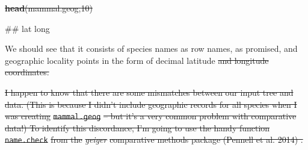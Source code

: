 \documentclass[fleqn,10pt,lineno]{wlpeerj}
\newenvironment{Shaded}{\begin{snugshade}}{\end{snugshade}}
\newcommand{\DecValTok}[1]{\textcolor[rgb]{0.00,0.00,0.81}{#1}}
\newcommand{\FunctionTok}[1]{\textcolor[rgb]{0.13,0.29,0.53}{\textbf{#1}}}
\newcommand{\NormalTok}[1]{#1}
\providecommand{\DIFaddtex}[1]{{\protect\color{blue}\uwave{#1}}} %
\providecommand{\DIFdeltex}[1]{{\protect\color{red}\sout{#1}}}                      %
\providecommand{\DIFaddbegin}{} %
\providecommand{\DIFaddend}{} %
\providecommand{\DIFdelbegin}{} %
\providecommand{\DIFdelend}{} %
\providecommand{\DIFmodbegin}{} %
\providecommand{\DIFmodend}{} %
\providecommand{\DIFadd}[1]{\texorpdfstring{\DIFaddtex{#1}}{#1}} %
\providecommand{\DIFdel}[1]{\texorpdfstring{\DIFdeltex{#1}}{}} %
\newcommand{\DIFscaledelfig}{0.5}
\newlength{\DIFdelgraphicswidth} %
\newlength{\DIFdelgraphicsheight} %
\newcommand{\DIFaddincludegraphics}[2][]{{\color{blue}\fbox{\DIFOincludegraphics[#1]{#2}}}} %
\newcommand{\DIFdelincludegraphics}[2][]{%
\sbox{\DIFdelgraphicsbox}{\DIFOincludegraphics[#1]{#2}}%
\settoboxwidth{\DIFdelgraphicswidth}{\DIFdelgraphicsbox} %
\settoboxtotalheight{\DIFdelgraphicsheight}{\DIFdelgraphicsbox} %
\scalebox{\DIFscaledelfig}{%
\parbox[b]{\DIFdelgraphicswidth}{\usebox{\DIFdelgraphicsbox}\\[-\baselineskip] \rule{\DIFdelgraphicswidth}{0em}}\llap{\resizebox{\DIFdelgraphicswidth}{\DIFdelgraphicsheight}{%
\setlength{\unitlength}{\DIFdelgraphicswidth}%
\begin{picture}(1,1)%
\thicklines\linethickness{2pt} %
{\color[rgb]{1,0,0}\put(0,0){\framebox(1,1){}}}%
{\color[rgb]{1,0,0}\put(0,0){\line( 1,1){1}}}%
{\color[rgb]{1,0,0}\put(0,1){\line(1,-1){1}}}%
\end{picture}%
}\hspace*{3pt}}} %
} %
\DeclareRobustCommand{\DIFaddbegin}{\DIFOaddbegin \let\includegraphics\DIFaddincludegraphics} %
\DeclareRobustCommand{\DIFaddend}{\DIFOaddend \let\includegraphics\DIFOincludegraphics} %
\DeclareRobustCommand{\DIFdelbegin}{\DIFOdelbegin \let\includegraphics\DIFdelincludegraphics} %
\DeclareRobustCommand{\DIFdelend}{\DIFOaddend \let\includegraphics\DIFOincludegraphics} %
\begin{document}
\begin{Shaded}
\begin{Highlighting}[]
\DIFdelbegin \DIFdel{\FunctionTok{head}\NormalTok{(mammal.geog,}\DecValTok{10}\NormalTok{)}
}\DIFdelend \DIFaddbegin \DIFadd{\NormalTok{tortoise.geog}
}\DIFaddend \end{Highlighting}
\end{Shaded}

\DIFmodbegin
\begin{DIFverbatim}[alsolanguage=DIFcode]
##                        lat      long
\end{DIFverbatim}
\DIFmodend

We should see that it consists of species names as row names, as
promised, and geographic locality points in the form of decimal latitude
\DIFdelbegin \DIFdel{and longitude coordinates.
}%

\DIFdel{I happen to know that there are some mismatches between our input tree
and data. (This is because I didn't include geographic records for all
species when I was creating }\texttt{\DIFdel{mammal.geog}} %
\DIFdel{-- but it's a very
common problem with comparative data!) To identify this discordance, I'm
going to use the handy function }\texttt{\DIFdel{name.check}} %
\DIFdel{from the
}\emph{\DIFdel{geiger}} %
\DIFdel{comparative methods package (Pennell et al. 2014) .
}%
\end{document}
